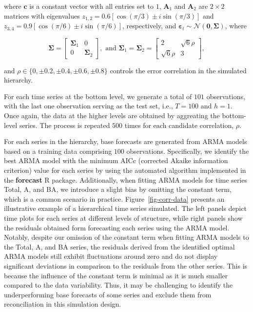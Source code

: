 \documentclass[11pt,a4paper,]{article}
\begin{document}
where \(\boldsymbol{c}\) is a constant vector with all entries set to
\(1\), \(\boldsymbol{A}_1\) and \(\boldsymbol{A}_2\) are \(2 \times 2\)
matrices with eigenvalues
\(z_{1,2}=0.6[\cos (\pi / 3) \pm i \sin (\pi / 3)]\) and
\(z_{3,4}=0.9[\cos (\pi / 6) \pm i \sin (\pi / 6)]\), respectively, and
\(\boldsymbol{\varepsilon}_t \sim \mathcal{N}(\boldsymbol{0}, \boldsymbol{\Sigma})\),
where

\[
\boldsymbol{\Sigma}=\left[\begin{array}{cc}
\boldsymbol{\Sigma}_1 & 0 \\0 & \boldsymbol{\Sigma}_2
\end{array}\right], \text { and } \boldsymbol{\Sigma}_1=\boldsymbol{\Sigma}_2=\left[\begin{array}{cc}2 & \sqrt{6} \rho \\\sqrt{6} \rho & 3\end{array}\right],
\]

and \(\rho \in \{0, \pm 0.2, \pm 0.4, \pm 0.6, \pm 0.8\}\) controls the
error correlation in the simulated hierarchy.

For each time series at the bottom level, we generate a total of \(101\)
observations, with the last one observation serving as the test set,
i.e., \(T=100\) and \(h=1\). Once again, the data at the higher levels
are obtained by aggreating the bottom-level series. The process is
repeated \(500\) times for each candidate correlation, \(\rho\).

For each series in the hierarchy, base forecasts are generated from ARMA
models based on a training data comprising \(100\) observations.
Specifically, we identify the best ARMA model with the minimum AICc
(corrected Akaike information criterion) value for each series by using
the automated algorithm implemented in the \textbf{forecast} R package.
Additionally, when fitting ARMA models for time series Total, A, and BA,
we introduce a slight bias by omitting the constant term, which is a
common scenario in practice. Figure~\ref{fig-corr-data} presents an
illustrative example of a hierarchical time series simulated. The left
panels depict time plots for each series at different levels of
structure, while right panels show the residuals obtained form
forecasting each series using the ARMA model. Notably, despite our
omission of the constant term when fitting ARMA models to the Total, A,
and BA series, the residuals derived from the identified optimal ARMA
models still exhibit fluctuations around zero and do not display
significant deviations in comparison to the residuals from the other
series. This is because the influence of the constant term is minimal as
it is much smaller compared to the data variability. Thus, it may be
challenging to identify the underperforming base forecasts of some
series and exclude them from reconciliation in this simulation design.
\end{document}
